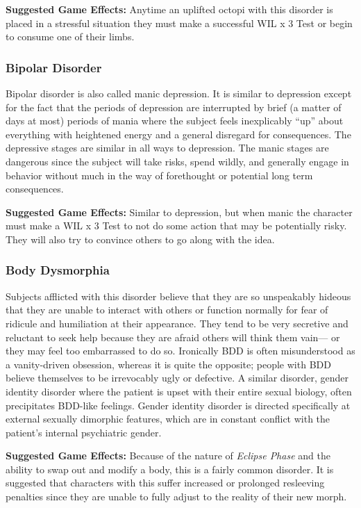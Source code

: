 \textbf{Suggested Game Effects: }Anytime an uplifted octopi 
with this disorder is placed in a stressful situation they 
must make a successful WIL x 3 Test or begin to consume
one of their limbs.

\subsubsection{Bipolar Disorder}

Bipolar disorder is also called manic depression. It is 
similar to depression except for the fact that the periods
of depression are interrupted by brief (a matter of
days at most) periods of mania where the subject feels 
inexplicably ``up'' about everything with heightened 
energy and a general disregard for consequences. The 
depressive stages are similar in all ways to depression. 
The manic stages are dangerous since the subject 
will take risks, spend wildly, and generally engage in 
behavior without much in the way of forethought or 
potential long term consequences.

\textbf{Suggested Game Effects: }Similar to depression, but 
when manic the character must make a WIL x 3 Test 
to not do some action that may be potentially risky. 
They will also try to convince others to go along with 
the idea.

\subsubsection{Body Dysmorphia}

Subjects afflicted with this disorder believe that they 
are so unspeakably hideous that they are unable to 
interact with others or function normally for fear of 
ridicule and humiliation at their appearance. They 
tend to be very secretive and reluctant to seek help 
because they are afraid others will think them vain—
or they may feel too embarrassed to do so. Ironically
BDD is often misunderstood as a vanity-driven
obsession, whereas it is quite the opposite; people 
with BDD believe themselves to be irrevocably ugly 
or defective. A similar disorder, gender identity disorder
where the patient is upset with their entire
sexual biology, often precipitates BDD-like feelings. 
Gender identity disorder is directed specifically  at 
external sexually dimorphic features, which are in 
constant conflict with the patient's internal psychiatric
gender.

\textbf{Suggested Game Effects: }Because of the nature of 
\textit{Eclipse Phase} and the ability to swap out and modify 
a body, this is a fairly common disorder. It is suggested
that characters with this suffer increased or
prolonged resleeving penalties since they are unable 
to fully adjust to the reality of their new morph.

